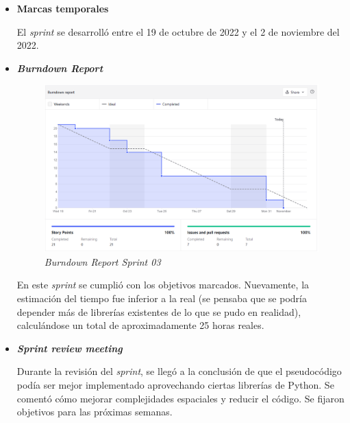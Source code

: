 \begin{itemize}
\begin{enumerate}
	\end{enumerate}
	
	\item \textbf{Marcas temporales}	
	
	El \textit{sprint} se desarrolló entre el 19 de octubre de 2022 y el 2 de noviembre del 2022.
	
	\item \textbf{\textit{Burndown Report}}
	
		\begin{figure}[h]
		\caption{\textit{Burndown Report Sprint 03}}
		\centering
		\includegraphics[width=\textwidth]{../img/anexos/bdr/s03_bdr}
		\end{figure}
	
	En este \textit{sprint} se cumplió con los objetivos marcados. Nuevamente, la estimación del tiempo fue inferior a la real (se pensaba que se podría depender más de librerías existentes de lo que se pudo en realidad), calculándose un total de aproximadamente 25 horas reales.

	\item \textbf{\textit{Sprint review meeting}}
	
	Durante la revisión del \textit{sprint}, se llegó a la conclusión de que el pseudocódigo podía ser mejor implementado aprovechando ciertas librerías de Python. Se comentó cómo mejorar complejidades espaciales y reducir el código. Se fijaron objetivos para las próximas semanas.
	
\end{itemize}


